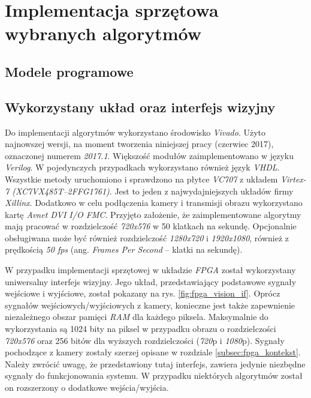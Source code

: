\chapter{Implementacja sprzętowa wybranych algorytmów}
\label{cha:implementacja_sprzetowa}

\section{Modele programowe}
\label{sec:modele_programowe}

\section{Wykorzystany układ oraz interfejs wizyjny}
\label{sec:uklad_interfejs}

Do implementacji algorytmów wykorzystano środowisko \textit{Vivado}. Użyto najnowszej wersji, na moment tworzenia niniejszej pracy (czerwiec 2017), oznaczonej numerem \textit{2017.1}. Większość modułów zaimplementowano w języku \textit{Verilog}. W pojedynczych przypadkach wykorzystano również język \textit{VHDL}. Wszystkie metody uruchomiono i sprawdzono na płytce \textit{VC707} z układem \textit{Virtex-7 (\small{XC7VX485T--2FFG1761})}. Jest to jeden z najwydajniejszych układów firmy \textit{Xillinx}. Dodatkowo w celu podłączenia kamery i transmisji obrazu wykorzystano kartę \textit{Avnet DVI I/O FMC}. Przyjęto założenie, że zaimplementowane algorytmy mają pracować w rozdzielczość \textit{720x576} w 50 klatkach na sekundę. Opcjonalnie obsługiwana może być również rozdzielczość \textit{1280x720} i \textit{1920x1080}, również z prędkością \textit{50 fps} (ang. \textit{Frames Per Second} -- klatki na sekundę). 

W przypadku implementacji sprzętowej w układzie \textit{FPGA} został wykorzystany uniwersalny interfejs wizyjny. Jego układ, przedstawiający podstawowe sygnały wejściowe i wyjściowe, został pokazany na rys. \ref{fig:fpga_vision_if}. Oprócz sygnałów wejściowych/wyjściowych z kamery, konieczne jest także zapewnienie niezależnego obszar pamięci \textit{RAM} dla każdego piksela. Maksymalnie do wykorzystania są 1024 bity na piksel w przypadku obrazu o rozdzielczości \textit{720x576} oraz 256 bitów dla wyższych rozdzielczości (\textit{720}p i \textit{1080}p). Sygnały pochodzące z kamery zostały szerzej opisane w rozdziale \ref{subsec:fpga_kontekst}. Należy zwrócić uwagę, że przedstawiony tutaj interfejs, zawiera jedynie niezbędne sygnały do funkcjonowania systemu. W przypadku niektórych algorytmów został on rozszerzony o dodatkowe wejścia/wyjścia. 

